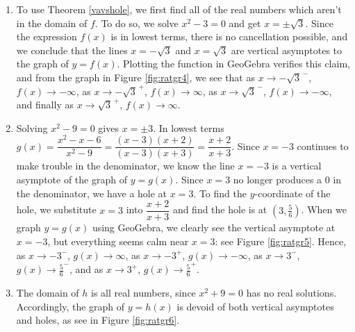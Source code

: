 {
\begin{enumerate}

\item  To use Theorem \ref{vavshole}, we first find all of the real numbers which aren't in the domain of $f$.  To do so, we solve $x^2 - 3 = 0$ and get $x = \pm \sqrt{3}$.  Since the expression $f(x)$ is in lowest terms, there is no cancellation possible, and we conclude that the lines $x = -\sqrt{3}$ and $x=\sqrt{3}$ are vertical asymptotes to the graph of $y=f(x)$. Plotting the function in GeoGebra verifies this claim, and from the graph in Figure \ref{fig:ratgr4}, we see that as $x \rightarrow -\sqrt{3}^{\, -}$, $f(x) \rightarrow -\infty$, as $x\rightarrow -\sqrt{3}^{\, +}$, $f(x) \rightarrow \infty$, as $x \rightarrow \sqrt{3}^{\, -}$, $f(x) \rightarrow -\infty$, and finally as $x\rightarrow \sqrt{3}^{\, +}$, $f(x) \rightarrow \infty$.


\item  Solving $x^2 - 9 = 0$ gives $x = \pm 3$.  In lowest terms $g(x) = \dfrac{x^2-x-6}{x^2-9} = \dfrac{(x-3)(x+2)}{(x-3)(x+3)} = \dfrac{x+2}{x+3}$.  Since $x=-3$ continues to make trouble in the denominator, we know the line $x=-3$ is a vertical asymptote of the graph of $y=g(x)$.  Since $x=3$ no longer produces a $0$ in the denominator,  we have a hole at $x=3$.  To find the $y$-coordinate of the hole, we substitute $x=3$ into $\dfrac{x+2}{x+3}$ and find the hole is at $\left(3, \frac{5}{6}\right)$.  When we graph $y=g(x)$ using GeoGebra, we clearly see the vertical asymptote at $x=-3$, but everything seems calm near $x=3$: see Figure \ref{fig:ratgr5}.  Hence, as $x \rightarrow -3^{-}$, $g(x) \rightarrow \infty$, as $x \rightarrow -3^{+}$, $g(x) \rightarrow -\infty$, as $x \rightarrow 3^{-}$, $g(x) \rightarrow \frac{5}{6}^{-}$, and as $x \rightarrow 3^{+}$, $g(x) \rightarrow \frac{5}{6}^{+}$.



\item  The domain of $h$ is all real numbers, since $x^2+9 = 0$ has no real solutions.  Accordingly, the graph of $y=h(x)$ is devoid of both vertical asymptotes and holes, as see in Figure \ref{fig:ratgr6}.




\end{enumerate}}
